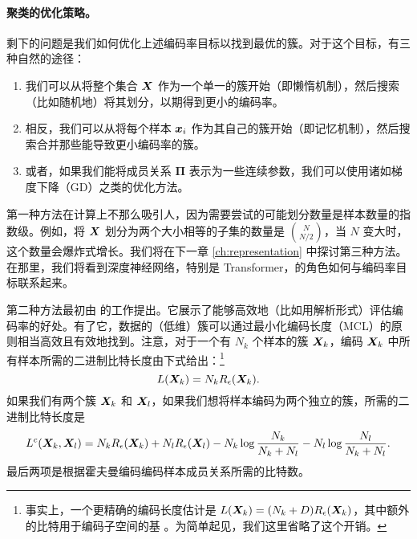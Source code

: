 \documentclass[../../book-main_zh.tex]{subfiles}
\begin{document}
\paragraph{聚类的优化策略。}
剩下的问题是我们如何优化上述编码率目标以找到最优的簇。对于这个目标，有三种自然的途径：
\begin{enumerate}
	\item 我们可以从将整个集合 $\bm{X}$ 作为一个单一的簇开始（即懒惰机制），然后搜索（比如随机地）将其划分，以期得到更小的编码率。
	\item 相反，我们可以从将每个样本 $\bm{x}_i$ 作为其自己的簇开始（即记忆机制），然后搜索合并那些能导致更小编码率的簇。
	\item 或者，如果我们能将成员关系 $\boldsymbol{\Pi}$ 表示为一些连续参数，我们可以使用诸如梯度下降（GD）之类的优化方法。
\end{enumerate}
第一种方法在计算上不那么吸引人，因为需要尝试的可能划分数量是样本数量的指数级。例如，将 $\bm{X}$ 划分为两个大小相等的子集的数量是 $N \choose N/2$，当 $N$ 变大时，这个数量会爆炸式增长。我们将在下一章 \ref{ch:representation} 中探讨第三种方法。在那里，我们将看到深度神经网络，特别是 Transformer，的角色如何与编码率目标联系起来。



第二种方法最初由 \cite{ma2007segmentation} 的工作提出。它展示了能够高效地（比如用解析形式）评估编码率的好处。有了它，数据的（低维）簇可以通过最小化编码长度（MCL）的原则相当高效且有效地找到。注意，对于一个有 $N_k$ 个样本的簇 $\bm{X}_k$，编码 $\bm{X}_k$ 中所有样本所需的二进制比特长度由下式给出：\footnote{事实上，一个更精确的编码长度估计是 $L(\bm{X}_k) = (N_k+D) R_\epsilon(\bm{X}_k)$，其中额外的比特用于编码子空间的基 \cite{ma2007segmentation}。为简单起见，我们这里省略了这个开销。}
\begin{equation}
	L(\bm{X}_k) = N_k R_\epsilon(\bm{X}_k).
\end{equation}
如果我们有两个簇 $\bm{X}_k$ 和 $\bm{X}_l$，如果我们想将样本编码为两个独立的簇，所需的二进制比特长度是
\begin{equation*}
	L^c(\bm{X}_k, \bm{X}_l) = N_k R_\epsilon(\bm{X}_k) + N_l R_\epsilon(\bm{X}_l) - N_k \log\frac{N_k}{N_k + N_l} - N_l \log\frac{N_l}{N_k + N_l}.
\end{equation*}
最后两项是根据霍夫曼编码编码样本成员关系所需的比特数。
\end{document}
